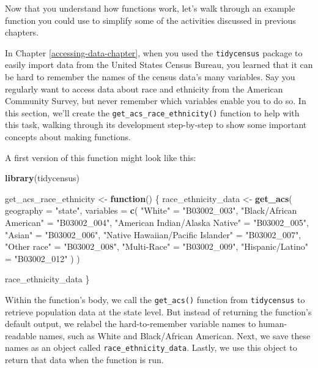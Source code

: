 \documentclass[
]{book}
\newenvironment{Shaded}{\begin{snugshade}}{\end{snugshade}}
\newcommand{\AttributeTok}[1]{\textcolor[rgb]{0.13,0.29,0.53}{#1}}
\newcommand{\ControlFlowTok}[1]{\textcolor[rgb]{0.13,0.29,0.53}{\textbf{#1}}}
\newcommand{\FunctionTok}[1]{\textcolor[rgb]{0.13,0.29,0.53}{\textbf{#1}}}
\newcommand{\NormalTok}[1]{#1}
\newcommand{\OtherTok}[1]{\textcolor[rgb]{0.56,0.35,0.01}{#1}}
\newcommand{\StringTok}[1]{\textcolor[rgb]{0.31,0.60,0.02}{#1}}
\begin{document}
Now that you understand how functions work, let's walk through an example function you could use to simplify some of the activities discussed in previous chapters.

In Chapter \ref{accessing-data-chapter}, when you used the \texttt{tidycensus} package to easily import data from the United States Census Bureau, you learned that it can be hard to remember the names of the census data's many variables. Say you regularly want to access data about race and ethnicity from the American Community Survey, but never remember which variables enable you to do so. In this section, we'll create the \texttt{get\_acs\_race\_ethnicity()} function to help with this task, walking through its development step-by-step to show some important concepts about making functions.

A first version of this function might look like this:

\begin{Shaded}
\begin{Highlighting}[]
\FunctionTok{library}\NormalTok{(tidycensus)}

\NormalTok{get\_acs\_race\_ethnicity }\OtherTok{\textless{}{-}} \ControlFlowTok{function}\NormalTok{() \{}
\NormalTok{  race\_ethnicity\_data }\OtherTok{\textless{}{-}}
    \FunctionTok{get\_acs}\NormalTok{(}
      \AttributeTok{geography =} \StringTok{"state"}\NormalTok{,}
      \AttributeTok{variables =} \FunctionTok{c}\NormalTok{(}
        \StringTok{"White"} \OtherTok{=} \StringTok{"B03002\_003"}\NormalTok{,}
        \StringTok{"Black/African American"} \OtherTok{=} \StringTok{"B03002\_004"}\NormalTok{,}
        \StringTok{"American Indian/Alaska Native"} \OtherTok{=} \StringTok{"B03002\_005"}\NormalTok{,}
        \StringTok{"Asian"} \OtherTok{=} \StringTok{"B03002\_006"}\NormalTok{,}
        \StringTok{"Native Hawaiian/Pacific Islander"} \OtherTok{=} \StringTok{"B03002\_007"}\NormalTok{,}
        \StringTok{"Other race"} \OtherTok{=} \StringTok{"B03002\_008"}\NormalTok{,}
        \StringTok{"Multi{-}Race"} \OtherTok{=} \StringTok{"B03002\_009"}\NormalTok{,}
        \StringTok{"Hispanic/Latino"} \OtherTok{=} \StringTok{"B03002\_012"}
\NormalTok{      )}
\NormalTok{    )}

\NormalTok{  race\_ethnicity\_data}
\NormalTok{\}}
\end{Highlighting}
\end{Shaded}

Within the function's body, we call the \texttt{get\_acs()} function from \texttt{tidycensus} to retrieve population data at the state level. But instead of returning the function's default output, we relabel the hard-to-remember variable names to human-readable names, such as White and Black/African American. Next, we save these names as an object called \texttt{race\_ethnicity\_data}. Lastly, we use this object to return that data when the function is run.
\end{document}
